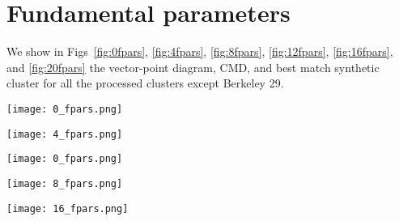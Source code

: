 \documentclass{aa}
\begin{document}
\begin{appendix}
 \begin{figure*}
  \caption{Same as Fig.~\ref{fig:BER29_struct}, but  for KRON31, SAU6, BER56, and BER102.}
  \label{fig:20struct}
 \end{figure*}


\FloatBarrier
\section{Fundamental parameters}
 \label{app:fundam_params}

 We show in Figs~\ref{fig:0fpars}, \ref{fig:4fpars}, \ref{fig:8fpars},
 \ref{fig:12fpars}, \ref{fig:16fpars}, and \ref{fig:20fpars} the vector-point
 diagram, CMD, and best match synthetic cluster for all the processed clusters
 except Berkeley 29.

 \begin{figure*}[t]
  \centering
  \texttt{[image: 0\_fpars.png]}
  \caption{Same as Fig.~\ref{fig:BER29_fpars}, but  for BER73, BER25, BER75, and BER26.}
  \label{fig:0fpars}
 \end{figure*}

 \begin{figure*}
  \centering
  \texttt{[image: 4\_fpars.png]}
  \caption{Same as Fig.~\ref{fig:BER29_fpars}, but  for TOMB2, BER76, F1212, and SAU1.}
  \label{fig:4fpars}
 \end{figure*}

 \begin{figure*}
  \centering
  \texttt{[image: 0\_fpars.png]}
  \caption{Same as Fig.~\ref{fig:BER29_fpars}, but  for CZER30, ARPM2, BH4, and F1419.}
  \label{fig:8fpars}
 \end{figure*}

 \begin{figure*}
  \centering
  \texttt{[image: 8\_fpars.png]}
  \caption{Same as Fig.~\ref{fig:BER29_fpars}, but  for BH37, E9205, E9218, and SAU3.}
  \label{fig:12fpars}
 \end{figure*}

 \begin{figure*}
  \centering
  \texttt{[image: 16\_fpars.png]}
  \caption{Same as Fig.~\ref{fig:BER29_fpars} for KRON39, E9308, BH144, and BH176.}
  \label{fig:16fpars}
 \end{figure*}


\end{appendix}
\end{document}
